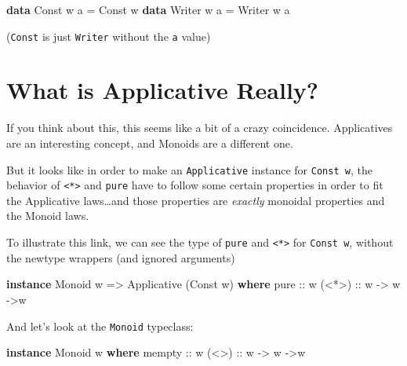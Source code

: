 \documentclass[]{article}
\newenvironment{Shaded}{}{}
\newcommand{\DataTypeTok}[1]{\textcolor[rgb]{0.56,0.13,0.00}{#1}}
\newcommand{\FunctionTok}[1]{\textcolor[rgb]{0.02,0.16,0.49}{#1}}
\newcommand{\KeywordTok}[1]{\textcolor[rgb]{0.00,0.44,0.13}{\textbf{#1}}}
\newcommand{\NormalTok}[1]{#1}
\newcommand{\OtherTok}[1]{\textcolor[rgb]{0.00,0.44,0.13}{#1}}
\begin{document}
\begin{Shaded}
\begin{Highlighting}[]
\KeywordTok{data} \DataTypeTok{Const}\NormalTok{  w a }\FunctionTok{=} \DataTypeTok{Const}\NormalTok{  w}
\KeywordTok{data} \DataTypeTok{Writer}\NormalTok{ w a }\FunctionTok{=} \DataTypeTok{Writer}\NormalTok{ w a}
\end{Highlighting}
\end{Shaded}

(\texttt{Const} is just \texttt{Writer} without the \texttt{a} value)

\hypertarget{what-is-applicative-really}{%
\section{What is Applicative Really?}\label{what-is-applicative-really}}

If you think about this, this seems like a bit of a crazy coincidence.
Applicatives are an interesting concept, and Monoids are a different one.

But it looks like in order to make an \texttt{Applicative} instance for
\texttt{Const\ w}, the behavior of \texttt{\textless{}*\textgreater{}} and
\texttt{pure} have to follow some certain properties in order to fit the
Applicative laws\ldots{}and those properties are \emph{exactly} monoidal
properties and the Monoid laws.

To illustrate this link, we can see the type of \texttt{pure} and
\texttt{\textless{}*\textgreater{}} for \texttt{Const\ w}, without the newtype
wrappers (and ignored arguments)

\begin{Shaded}
\begin{Highlighting}[]
\KeywordTok{instance} \DataTypeTok{Monoid}\NormalTok{ w }\OtherTok{=>} \DataTypeTok{Applicative}\NormalTok{ (}\DataTypeTok{Const}\NormalTok{ w) }\KeywordTok{where}
\OtherTok{    pure  ::}\NormalTok{ w}
\OtherTok{    (<*>) ::}\NormalTok{ w }\OtherTok{->}\NormalTok{ w }\OtherTok{->}\NormalTok{w}
\end{Highlighting}
\end{Shaded}

And let's look at the \texttt{Monoid} typeclass:

\begin{Shaded}
\begin{Highlighting}[]
\KeywordTok{instance} \DataTypeTok{Monoid}\NormalTok{ w }\KeywordTok{where}
\OtherTok{    mempty ::}\NormalTok{ w}
\OtherTok{    (<>)   ::}\NormalTok{ w }\OtherTok{->}\NormalTok{ w }\OtherTok{->}\NormalTok{w}
\end{Highlighting}
\end{Shaded}
\end{document}
